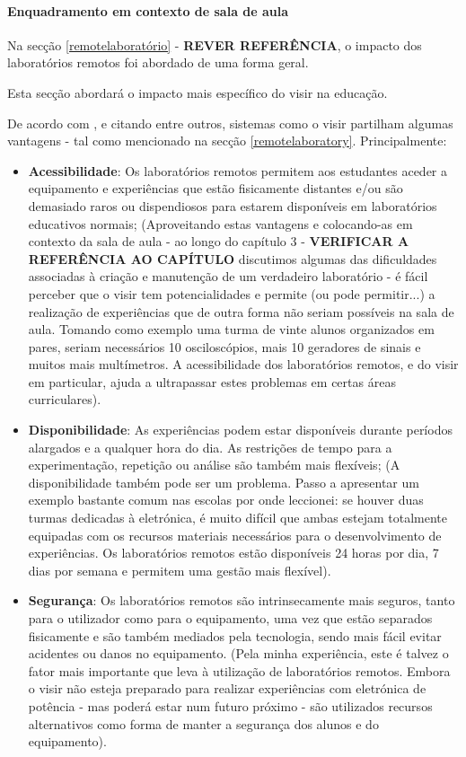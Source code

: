 \paragraph{Enquadramento em contexto de sala de aula}
Na secção \ref{remotelaboratório} - \textbf{REVER REFERÊNCIA}, o impacto dos laboratórios remotos foi abordado de uma forma geral. 

Esta secção abordará o impacto mais específico do \acrshort{visir} na educação.

De acordo com \cite{RemoteLabsImpactVISIR}, e citando \cite{TheVISIRproject} entre outros, sistemas como o \acrshort{visir} partilham algumas vantagens - tal como mencionado na secção \ref{remotelaboratory}. Principalmente:
\begin{itemize}
    \item \textbf{Acessibilidade}: Os laboratórios remotos permitem aos estudantes aceder a equipamento e experiências que estão fisicamente distantes e/ou são demasiado raros ou dispendiosos para estarem disponíveis em laboratórios educativos normais;
    (Aproveitando estas vantagens e colocando-as em contexto da sala de aula - ao longo do capítulo 3 - \textbf{VERIFICAR A REFERÊNCIA AO CAPÍTULO} discutimos algumas das dificuldades associadas à criação e manutenção de um verdadeiro laboratório - é fácil perceber que o \acrshort{visir} tem potencialidades e permite (ou pode permitir...) a realização de experiências que de outra forma não seriam possíveis na sala de aula. Tomando como exemplo uma turma de vinte alunos organizados em pares, seriam necessários 10 osciloscópios, mais 10 geradores de sinais e muitos mais multímetros. A acessibilidade dos laboratórios remotos, e do \acrshort{visir} em particular, ajuda a ultrapassar estes problemas em certas áreas curriculares).
    \item \textbf{Disponibilidade}: As experiências podem estar disponíveis durante períodos alargados e a qualquer hora do dia. As restrições de tempo para a experimentação, repetição ou análise são também mais flexíveis;
    (A disponibilidade também pode ser um problema. Passo a apresentar um exemplo bastante comum nas escolas por onde leccionei: se houver duas turmas dedicadas à eletrónica, é muito difícil que ambas estejam totalmente equipadas com os recursos materiais necessários para o desenvolvimento de experiências. Os laboratórios remotos estão disponíveis 24 horas por dia, 7 dias por semana e permitem uma gestão mais flexível).

    \item \textbf{Segurança}: Os laboratórios remotos são intrinsecamente mais seguros, tanto para o utilizador como para o equipamento, uma vez que estão separados fisicamente e são também mediados pela tecnologia, sendo mais fácil evitar acidentes ou danos no equipamento.
    (Pela minha experiência, este é talvez o fator mais importante que leva à utilização de laboratórios remotos. Embora o \acrshort{visir} não esteja preparado para realizar experiências com eletrónica de potência - mas poderá estar num futuro próximo - são utilizados recursos alternativos como forma de manter a segurança dos alunos e do equipamento).
\end{itemize}


